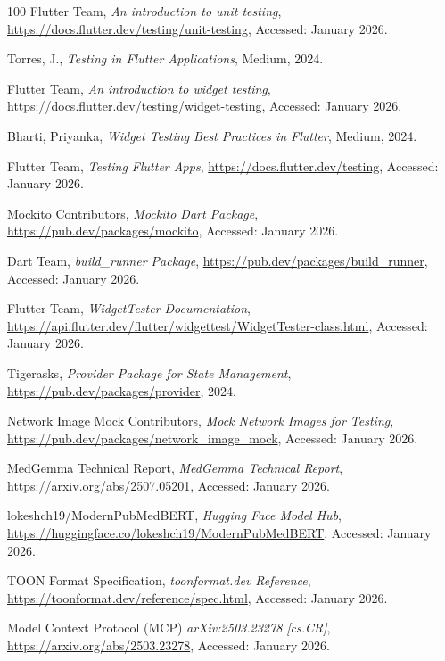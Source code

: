 \begin{thebibliography}{100}
  Flutter Team,
  \textit{An introduction to unit testing},
  \url{https://docs.flutter.dev/testing/unit-testing}, Accessed: January 2026.

  Torres, J.,
  \textit{Testing in Flutter Applications},
  Medium, 2024.

  Flutter Team,
  \textit{An introduction to widget testing},
  \url{https://docs.flutter.dev/testing/widget-testing}, Accessed: January 2026.

  Bharti, Priyanka,
  \textit{Widget Testing Best Practices in Flutter},
  Medium, 2024.

  Flutter Team,
  \textit{Testing Flutter Apps},
  \url{https://docs.flutter.dev/testing}, Accessed: January 2026.

  Mockito Contributors,
  \textit{Mockito Dart Package},
  \url{https://pub.dev/packages/mockito}, Accessed: January 2026.

  Dart Team,
  \textit{build\_runner Package},
  \url{https://pub.dev/packages/build_runner}, Accessed: January 2026.

  Flutter Team,
  \textit{WidgetTester Documentation},
  \url{https://api.flutter.dev/flutter/widgettest/WidgetTester-class.html}, Accessed: January 2026.

  Tigerasks,
  \textit{Provider Package for State Management},
  \url{https://pub.dev/packages/provider}, 2024.

  Network Image Mock Contributors,
  \textit{Mock Network Images for Testing},
  \url{https://pub.dev/packages/network_image_mock}, Accessed: January 2026.

  MedGemma Technical Report,
  \textit{MedGemma Technical Report},
  \url{https://arxiv.org/abs/2507.05201}, Accessed: January 2026.

  lokeshch19/ModernPubMedBERT,
  \textit{Hugging Face Model Hub},
  \url{https://huggingface.co/lokeshch19/ModernPubMedBERT}, Accessed: January 2026.

  TOON Format Specification,
  \textit{toonformat.dev Reference},
  \url{https://toonformat.dev/reference/spec.html}, Accessed: January 2026.

  Model Context Protocol (MCP)
  \textit{arXiv:2503.23278 [cs.CR]},
  \url{https://arxiv.org/abs/2503.23278}, Accessed: January 2026.



\end{thebibliography}

